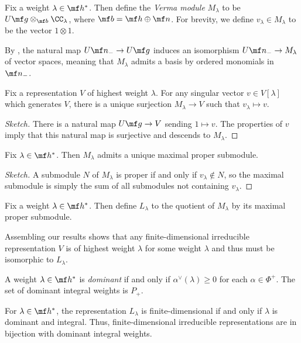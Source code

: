 \documentclass{article}
\begin{document}
\begin{definition}
	Fix a weight $\lambda\in\mf h^*$. Then define the \textit{Verma module} $M_\lambda$ to be $U\mf g\otimes_{\mf b}\CC_\lambda$, where $\mf b=\mf h\oplus\mf n$. For brevity, we define $v_\lambda\in M_\lambda$ to be the vector $1\otimes1$.
\end{definition}
\begin{remark}
	By , the natural map $U\mf n_-\to U\mf g$ induces an isomorphism $U\mf n_-\to M_\lambda$ of vector spaces, meaning that $M_\lambda$ admits a basis by ordered monomials in $\mf n_-$.
\end{remark}
\begin{lemma}
	Fix a representation $V$ of highest weight $\lambda$. For any singular vector $v\in V[\lambda]$ which generates $V$, there is a unique surjection $M_\lambda\to V$ such that $v_\lambda\mapsto v$.
\end{lemma}
\begin{proof}[Sketch]
	There is a natural map $U\mf g\to V$ sending $1\mapsto v$. The properties of $v$ imply that this natural map is surjective and descends to $M_\lambda$.
\end{proof}
\begin{lemma}
	Fix $\lambda\in\mf h^*$. Then $M_\lambda$ admits a unique maximal proper submodule.
\end{lemma}
\begin{proof}[Sketch]
	A submodule $N$ of $M_\lambda$ is proper if and only if $v_\lambda\notin N$, so the maximal submodule is simply the sum of all submodules not containing $v_\lambda$.
\end{proof}
\begin{notation}
	Fix a weight $\lambda\in\mf h^*$. Then define $L_\lambda$ to the quotient of $M_\lambda$ by its maximal proper submodule.
\end{notation}
\begin{remark}
	Assembling our results shows that any finite-dimensional irreducible representation $V$ is of highest weight $\lambda$ for some weight $\lambda$ and thus must be isomorphic to $L_\lambda$.
\end{remark}
\begin{definition}[dominant]
	A weight $\lambda\in\mf h^*$ is \textit{dominant} if and only if $\alpha^\lor(\lambda)\ge0$ for each $\alpha\in\Phi^+$. The set of dominant integral weights is $P_+$.
\end{definition}
\begin{theorem}
	For $\lambda\in\mf h^*$, the representation $L_\lambda$ is finite-dimensional if and only if $\lambda$ is dominant and integral. Thus, finite-dimensional irreducible representations are in bijection with dominant integral weights.
\end{theorem}
\end{document}
